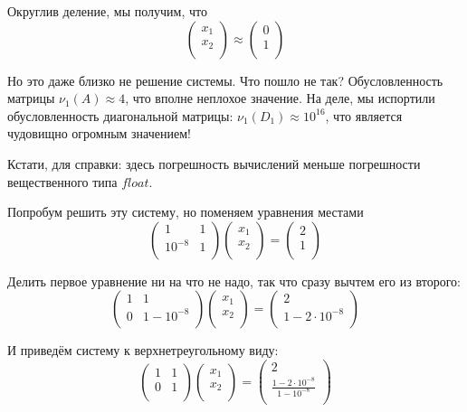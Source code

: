 \documentclass{article}
\begin{document}
\begin{example}
	Округлив деление, мы получим, что
	\[
		\begin{pmatrix}
			x_1 \\
			x_2 \\
		\end{pmatrix}
		\approx
		\begin{pmatrix}
			0 \\
			1 \\
		\end{pmatrix}
	\]

	Но это даже близко не решение системы. Что пошло не так? Обусловленность
	матрицы $\nu_1(A)\approx 4$, что вполне неплохое значение. На деле, мы
	испортили обусловленность диагональной матрицы: $\nu_1(D_1)\approx
	10^{16}$, что является чудовищно огромным значением!

	Кстати, для справки: здесь погрешность вычислений меньше погрешности
	вещественного типа $float$.

	Попробум решить эту систему, но поменяем уравнения местами
	\[
		\begin{pmatrix}
			1	& 1	\\
			10^{-8}	& 1	\\
		\end{pmatrix}
		\begin{pmatrix}
			x_1 \\
			x_2 \\
		\end{pmatrix}
		=
		\begin{pmatrix}
			2 \\
			1 \\
		\end{pmatrix}
	\]

	Делить первое уравнение ни на что не надо, так что сразу вычтем его
	из второго:
	\[
		\begin{pmatrix}
			1	& 1	\\
			0	&1-10^{-8}\\
		\end{pmatrix}
		\begin{pmatrix}
			x_1 \\
			x_2 \\
		\end{pmatrix}
		=
		\begin{pmatrix}
			2 \\
			1-2\cdot 10^{-8} \\
		\end{pmatrix}
	\]

	И приведём систему к верхнетреугольному виду:
	\[
		\begin{pmatrix}
			1	& 1	\\
			0	& 1	\\
		\end{pmatrix}
		\begin{pmatrix}
			x_1 \\
			x_2 \\
		\end{pmatrix}
		=
		\begin{pmatrix}
			2 \\
			\frac{1-2\cdot 10^{-8}}{1-10^{-8}} \\
		\end{pmatrix}
	\]


\end{example}
\end{document}
